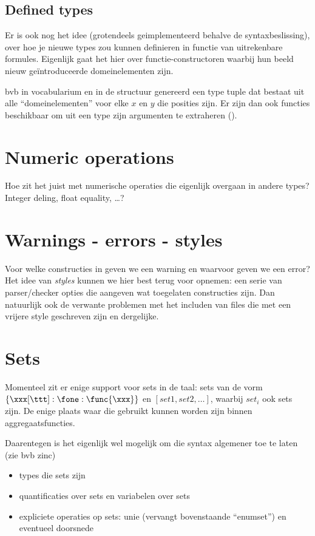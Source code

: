 \documentclass{article}
\begin{document}

\subsection{Defined types}
Er is ook nog het idee (grotendeels geimplementeerd behalve de syntaxbeslissing), over hoe je nieuwe types zou kunnen definieren in functie van uitrekenbare formules. Eigenlijk gaat het hier over functie-constructoren waarbij hun beeld nieuw geïntroduceerde domeinelementen zijn.

bvb  in vocabularium en  in de structuur genereerd een type tuple dat bestaat uit alle ``domeinelementen''  voor elke $x$ en $y$ die posities zijn. Er zijn dan ook functies beschikbaar om uit een type zijn argumenten te extraheren ().



\section{Numeric operations}
Hoe zit het juist met numerische operaties die eigenlijk overgaan in andere types? Integer deling, float equality, \ldots?



\section{Warnings - errors - styles}
Voor welke constructies in \foidp geven we een warning en waarvoor geven we een error? Het idee van \emph{styles} kunnen we hier best terug voor opnemen: een serie van parser/checker opties die aangeven wat toegelaten constructies zijn. Dan natuurlijk ook de verwante problemen met het includen van files die met een vrijere style geschreven zijn en dergelijke.



\section{Sets}
Momenteel zit er enige support voor sets in de taal: sets van de vorm $\{\xxx[\ttt]: \fone : \func{\xxx}\}$ en $[set1, set2, \ldots]$, waarbij $set_i$ ook sets zijn. De enige plaats waar die gebruikt kunnen worden zijn binnen aggregaatsfuncties.

Daarentegen is het eigenlijk wel mogelijk om die syntax algemener toe te laten (zie bvb zinc)
\begin{itemize}
  \item types die sets zijn
  \item quantificaties over sets en variabelen over sets
  \item expliciete operaties op sets: unie (vervangt bovenstaande ``enumset'') en eventueel doorsnede
\end{itemize}
\end{document}
